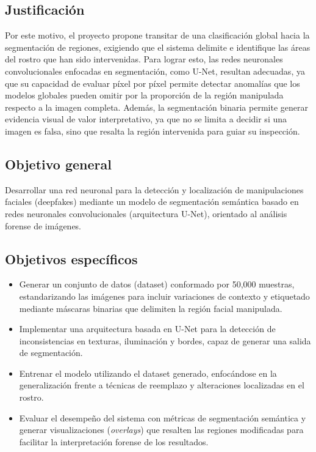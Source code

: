 \subsection{Justificación}

Por este motivo, el proyecto propone transitar de una clasificación global hacia la segmentación de regiones, exigiendo que el sistema delimite e identifique las áreas del rostro que han sido intervenidas. Para lograr esto, las redes neuronales convolucionales enfocadas en segmentación, como U-Net, resultan adecuadas, ya que su capacidad de evaluar píxel por píxel permite detectar anomalías que los modelos globales pueden omitir por la proporción de la región manipulada respecto a la imagen completa. Además, la segmentación binaria permite generar evidencia visual de valor interpretativo, ya que no se limita a decidir si una imagen es falsa, sino que resalta la región intervenida para guiar su inspección.

\subsection{Objetivo general}

Desarrollar una red neuronal para la detección y localización de manipulaciones faciales (deepfakes) mediante un modelo de segmentación semántica basado en redes neuronales convolucionales (arquitectura U-Net), orientado al análisis forense de imágenes.

\subsection{Objetivos específicos}

\begin{itemize}
    \item Generar un conjunto de datos (dataset) conformado por 50,000 muestras, estandarizando las imágenes para incluir variaciones de contexto y etiquetado mediante máscaras binarias que delimiten la región facial manipulada.
    \item Implementar una arquitectura basada en U-Net para la detección de inconsistencias en texturas, iluminación y bordes, capaz de generar una salida de segmentación.
    \item Entrenar el modelo utilizando el dataset generado, enfocándose en la generalización frente a técnicas de reemplazo y alteraciones localizadas en el rostro.
    \item Evaluar el desempeño del sistema con métricas de segmentación semántica y generar visualizaciones (\textit{overlays}) que resalten las regiones modificadas para facilitar la interpretación forense de los resultados.
\end{itemize}

